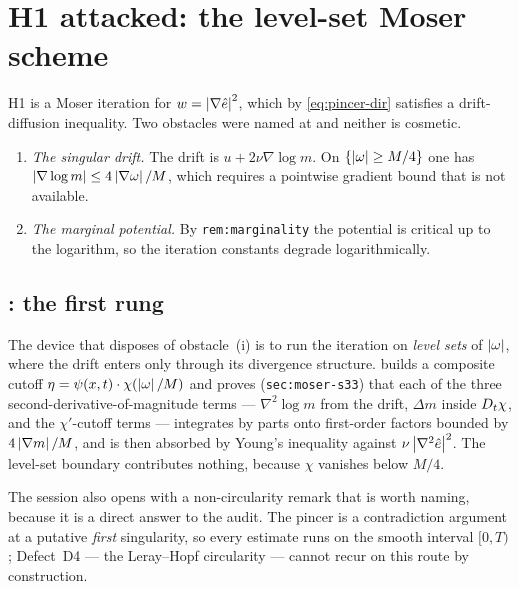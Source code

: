\section{H1 attacked: the level-set Moser scheme}
\label{sec:moser}

H1 is a Moser iteration for \(w=\left|\nabla\hat{e}\right|^2\), which by
\eqref{eq:pincer-dir} satisfies a drift-diffusion inequality. Two obstacles
were named at  and neither is cosmetic.

\begin{enumerate}[leftmargin=2.2em]
\item \emph{The singular drift.} The drift is \(u+2\nu\nabla\log m\). On
  \(\{\left|\omega\right|\ge M/4\}\) one has \(\left|\nabla\log m\right|\le4\left|\nabla\omega\right|/M\),
  which requires a pointwise gradient bound that is not available.
\item \emph{The marginal potential.} By \texttt{rem:marginality} the potential
  is critical up to the logarithm, so the iteration constants degrade
  logarithmically.
\end{enumerate}

\subsection{\texorpdfstring{: the first rung}{S33: the first rung}}

The device that disposes of obstacle~(i) is to run the iteration on
\emph{level sets} of \(\left|\omega\right|\), where the drift enters only through its
divergence structure.  builds a composite cutoff
\(\eta=\psi(x,t)\cdot\chi(\left|\omega\right|/M)\) and proves
(\texttt{sec:moser-s33}) that each of the three second-derivative-of-magnitude
terms --- \(\nabla^2\log m\) from the drift, \(\Delta m\) inside
\(D_t\chi\), and the \(\chi'\)-cutoff terms --- integrates by parts onto
first-order factors bounded by \(4\left|\nabla m\right|/M\), and is then absorbed by
Young's inequality against \(\nu\left|\nabla^2\hat{e}\right|^2\). The level-set boundary
contributes nothing, because \(\chi\) vanishes below \(M/4\).

The session also opens with a non-circularity remark that is worth naming,
because it is a direct answer to the audit. The pincer is a contradiction
argument at a putative \emph{first} singularity, so every estimate runs on the
smooth interval \([0,T)\); Defect~D4 --- the Leray--Hopf circularity --- cannot
recur on this route by construction.

